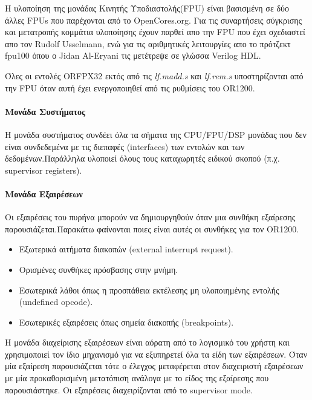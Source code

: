 \documentclass[a4paper,10pt]{article}
\numberwithin{figure}{subsection}
\numberwithin{table}{subsection}
\begin{document}
{Η υλοποίηση της μονάδας Κινητής Υποδιαστολής(FPU) είναι βασισμένη σε δύο άλλες FPUs που 
παρέχονται από το OpenCores.org. Για τις συναρτήσεις σύγκρισης και μετατροπής κομμάτια υλοποίησης
έχουν παρθεί απο την FPU που έχει σχεδιαστεί απο τον Rudolf Usselmann, ενώ για τις αριθμητικές
λειτουργίες απο το πρότζεκτ fpu100 όπου ο Jidan Al-Eryani τις μετέτρεψε σε γλώσσα Verilog HDL.


Όλες οι εντολές ORFPX32 εκτός από τις \emph{lf.madd.s} και \emph{lf.rem.s} υποστηρίζονται από την FPU όταν
αυτή έχει ενεργοποιηθεί από τις ρυθμίσεις του OR1200.

\paragraph{Μονάδα Συστήματος\newline\newline}

Η μονάδα συστήματος συνδέει όλα τα σήματα της CPU/FPU/DSP μονάδας που δεν είναι συνδεδεμένα
με τις διεπαφές (interfaces) των εντολών και των δεδομένων.Παράλληλα υλοποιεί όλους τους καταχωρητές ειδικού σκοπού (π.χ. supervisor registers).

\paragraph{Μονάδα Εξαιρέσεων \newline\newline}

Οι εξαιρέσεις του πυρήνα μπορούν να δημιουργηθούν όταν μια συνθήκη εξαίρεσης παρουσιάζεται.Παρακάτω φαίνονται ποιες είναι αυτές
οι συνθήκες για τον OR1200.

\begin{itemize}
 \item Εξωτερικά αιτήματα διακοπών (external interrupt request).
 \item Ορισμένες συνθήκες πρόσβασης στην μνήμη.
 \item Εσωτερικά λάθοι όπως η προσπάθεια εκτέλεσης μη υλοποιημένης εντολής (undefined opcode).
 \item Εσωτερικές εξαιρέσεις όπως σημεία διακοπής (breakpoints).
\end{itemize}

Η μονάδα διαχείρισης εξαιρέσεων είναι αόρατη από το λογισμικό του χρήστη και χρησιμοποιεί τον ίδιο
μηχανισμό για να εξυπηρετεί όλα τα είδη των εξαιρέσεων. Όταν μία εξαίρεση παρουσιάζεται τότε ο έλεγχος
μεταφέρεται στον διαχειριστή εξαιρέσεων με μία προκαθορισμένη μετατόπιση ανάλογα με το είδος της εξαίρεσης που παρουσιάστηκε.
Οι εξαιρέσεις διαχειρίζονται από το supervisor mode.

}
\end{document}
